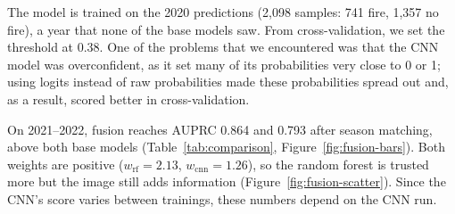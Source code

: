 The model is trained on the 2020 predictions (2,098 samples: 741 fire, 1,357 no fire), a year that none of the base models saw. From cross-validation, we set the threshold at 0.38. One of the problems that we encountered was that the CNN model was overconfident, as it set many of its probabilities very close to 0 or 1; using logits instead of raw probabilities made these probabilities spread out and, as a result, scored better in cross-validation.

On 2021--2022, fusion reaches AUPRC 0.864 and 0.793 after season matching, above both base models (Table~\ref{tab:comparison}, Figure~\ref{fig:fusion-bars}). Both weights are positive ($w_{\text{rf}} = 2.13$, $w_{\text{cnn}} = 1.26$), so the random forest is trusted more but the image still adds information (Figure~\ref{fig:fusion-scatter}). Since the CNN's score varies between trainings, these numbers depend on the CNN run.
